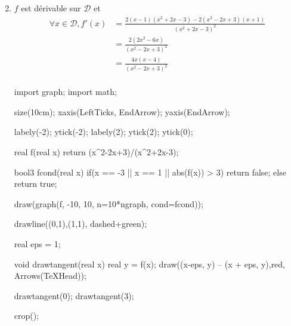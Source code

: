 \begin{exm}
\begin{enumerate}
\[			\] 
		\item $f$ est dérivable sur $\mathcal{D}$ et 
			\begin{align*}
				\forall x \in \mathcal{D}, f'(x) &= \frac{2(x-1)(x^2+2x-3) - 2(x^2-2x+3)(x+1)}{(x^2+2x-3)^2}\\
				&= \frac{2(2x^2 - 6x)}{(x^2-2x+3)^2} \\
				&= \frac{4x(x-4)}{(x^2-2x+3)^2} \\
			\end{align*}
			\begin{center}
			\end{center}

			\begin{center}
				\begin{asy}
					import graph;
					import math;

					size(10cm);
					xaxis(LeftTicks, EndArrow);
					yaxis(EndArrow);

					labely(-2); ytick(-2);
					labely(2); ytick(2);
					ytick(0);

					real f(real x) {return (x^2-2x+3)/(x^2+2x-3);}

					bool3 fcond(real x) {
						if(x == -3 || x == 1 || abs(f(x)) > 3)
							return false;
						else
							return true;
					}

					draw(graph(f, -10, 10, n=10*ngraph, cond=fcond));

					drawline((0,1),(1,1), dashed+green);

					real eps = 1;

					void drawtangent(real x) {real y = f(x); draw((x-eps, y) -- (x + eps, y),red, Arrows(TeXHead)); }

					drawtangent(0);
					drawtangent(3);

					crop();
				\end{asy}
			\end{center}
	\end{enumerate}
\end{exm}
